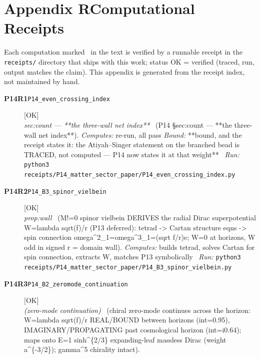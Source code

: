 \clearpage
\section*{Appendix R\quad Computational Receipts}\label{app:receipts}
\small\noindent Each computation marked \rcptmarker\ in the text is verified by a runnable receipt in the \texttt{receipts/} directory that ships with this work; status \textsf{OK} = verified (traced, run, output matches the claim). This appendix is generated from the receipt index, not maintained by hand.\par\medskip
\begingroup\renewcommand{\arraystretch}{1.25}
\begin{description}
\item[\textbf{P14R1}\quad\texttt{P14\_even\_crossing\_index}]\hfill\textsf{[OK]}\\
\textit{sec:count --- **the three-wall net index**} \ (P14 \S{}sec:count --- **the three-wall net index**). 
\emph{Computes:} re-run, all pass
 \emph{Bound:} **bound, and the receipt states it: the Atiyah--Singer statement on the branched bead is TRACED, not computed --- P14 now states it at that weight**
\ \emph{Run:} \texttt{python3 receipts/P14\_matter\_sector\_paper/P14\_even\_crossing\_index.py}
\item[\textbf{P14R2}\quad\texttt{P14\_B3\_spinor\_vielbein}]\hfill\textsf{[OK]}\\
\textit{prop:wall} \ (M!=0 spinor vielbein DERIVES the radial Dirac superpotential W=lambda sqrt(f)/r (P13 deferred): tetrad -> Cartan structure eqns -> spin connection omega\textasciicircum{}2\_1=omega\textasciicircum{}3\_1=(sqrt f/r)e; W=0 at horizons, W odd in signed r = domain wall). 
\emph{Computes:} builds tetrad, solves Cartan for spin connection, extracts W, matches P13 symbolically
\ \emph{Run:} \texttt{python3 receipts/P14\_matter\_sector\_paper/P14\_B3\_spinor\_vielbein.py}
\item[\textbf{P14R3}\quad\texttt{P14\_B2\_zeromode\_continuation}]\hfill\textsf{[OK]}\\
\textit{(zero-mode continuation)} \ (chiral zero-mode continues across the horizon: W=lambda sqrt(f)/r REAL/BOUND between horizons (int=0.95), IMAGINARY/PROPAGATING past cosmological horizon (int=i0.64); maps onto E=1 sinh\textasciicircum{}\{2/3\} expanding-leaf massless Dirac (weight a\textasciicircum{}\{-3/2\}); gamma\textasciicircum{}5 chirality intact). 

\end{description}
